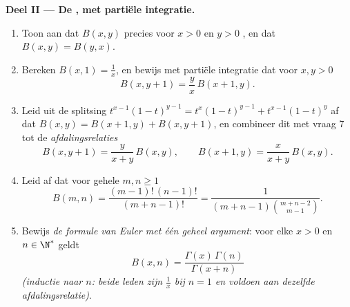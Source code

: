 \begin{problem}
\medskip
\noindent\textbf{Deel II --- De , met partiële
integratie.}
\begin{enumerate}[resume]
  \item Toon aan dat $B(x,y)$ precies voor $x > 0$ en $y > 0$
        , en dat $B(x,y) = B(y,x)$.
  \item Bereken $B(x, 1) = \frac1x$, en bewijs met partiële
        integratie dat voor $x, y > 0$
        \[
        B(x, y+1) = \frac{y}{x}\,B(x+1, y) .
        \]
  \item Leid uit de splitsing $t^{x-1}(1-t)^{y-1} = t^{x}(1-t)^{y-1}
        + t^{x-1}(1-t)^{y}$ af dat $B(x,y) = B(x+1,y) + B(x,y+1)$,
        en combineer dit met vraag 7 tot de
        \emph{afdalingsrelaties}
        \[
        B(x, y+1) = \frac{y}{x+y}\,B(x,y),
        \qquad
        B(x+1, y) = \frac{x}{x+y}\,B(x,y) .
        \]
  \item Leid af dat voor gehele $m, n \geq 1$
        \[
        B(m, n) = \frac{(m-1)!\,(n-1)!}{(m+n-1)!}
        = \frac{1}{(m+n-1)\binom{m+n-2}{m-1}} .
        \]
  \item Bewijs \emph{de formule van Euler met één geheel argument}:
        voor elke $x > 0$ en $n \in \N^*$ geldt
        \[
        B(x, n) = \frac{\Gamma(x)\,\Gamma(n)}{\Gamma(x + n)}
        \]
        \emph{(inductie naar $n$: beide leden zijn $\frac1x$ bij $n
        = 1$ en voldoen aan dezelfde afdalingsrelatie)}.
\end{enumerate}


\end{problem}
